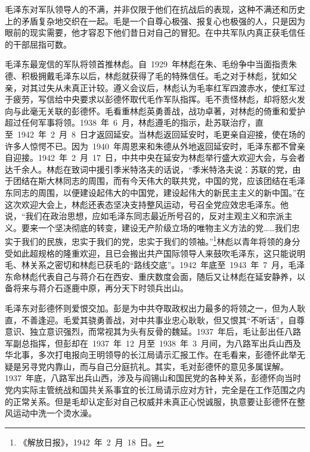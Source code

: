 毛泽东对军队领导人的不满，并非仅限于他们在抗战后的表现，这种不满还和历史上的矛盾复杂地交织在一起。毛是一个自尊心极强、报复心也极强的人，只是因为眼前的现实需要，他才容忍下他们昔日对自己的冒犯。在中共军队内真正获毛信任的干部屈指可数。

毛泽东最宠信的军队将领首推林彪。自~1929~年林彪在朱、毛纷争中当面指责朱德、积极拥戴毛泽东以后，林彪就获得了毛的特殊信任。毛之对于林彪，犹如父亲，对其过失从未真正计较。遵义会议后，林彪认为毛率红军四渡赤水，使红军过于疲劳，写信给中央要求以彭德怀取代毛作军队指挥。毛不责怪林彪，却将怒火发向与此毫无关联的彭德怀。毛看重林彪英勇善战，战功卓著，对林彪的倚重和爱护超过任何军事将领。1938~年~6~月，林彪遵毛的指示，赴苏联治疗，直至~1942~年~2~月~8~日才返回延安。当林彪返回延安时，毛更亲自迎接，使在场的许多人惊愕不已。因为~1940~年周恩来和朱德从外地返回延安时，毛泽东都不曾亲自迎接。1942~年~2~月~17~日，中共中央在延安为林彪举行盛大欢迎大会，与会者达千余人。林彪在致词中援引季米特洛夫的话说，“季米特洛夫说：苏联的党，由于团结在斯大林同志的周围，而有今天伟大的联共党，中国的党，应该团结在毛泽东同志的周围，以便建设起伟大的中国党，建设起伟大的新民主主义的新中国。”在这次欢迎大会上，林彪还表态坚决支持整风运动，号召全党应效忠毛泽东。他说，“我们在政治思想，应如毛泽东同志最近所号召的，反对主观主义和宗派主义。要来一个坚决彻底的转变，建设无产阶级立场的唯物主义方法的党……我们忠实于我们的民族，忠实于我们的党，忠实于我们的领袖。”\footnote{《解放日报》，1942~年~2~月~18~日。}林彪以青年将领的身分受如此超规格的隆重欢迎，且已会搬出共产国际领导人来鼓吹毛泽东，这只能说明毛、林关系之密切和林彪已获毛的“路线交底”。1942~年底至~1943~年~7~月，毛泽东命林彪代表自己与蒋介石在西安、重庆数度会面，随后又让林彪在延安静养，以备将来与蒋介石逐鹿中原，再分天下时领兵出山。

毛泽东对彭德怀则爱恨交加。彭是为中共夺取政权出力最多的将领之一，但为人耿直，不善逢迎。毛爱其骁勇善战，对中共事业忠心耿耿，但又恨其“不听话”，自尊意识、独立意识强烈，而常视其为头有反骨的魏延。1937~年后，毛让彭出任八路军副总指挥，但彭却在~1937~年~12~月至~1938~年~3~月间，为八路军出兵山西及华北事，多次打电报向王明领导的长江局请示汇报工作。在毛看来，彭德怀此举无疑是另寻党内靠山，而与自己分庭抗礼。其实，毛对彭德怀的意见多属误解。1937~年底，八路军出兵山西，涉及与阎锡山和国民党的各种关系，彭德怀向当时党内实际主管统战和国共关系事宜的长江局请示应对方针，完全是在工作范围之内的正常关系。但是毛却认定彭对自己权威并未真正心悦诚服，执意要让彭德怀在整风运动中洗一个烫水澡。

